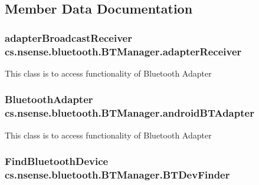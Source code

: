 \subsection{Member Data Documentation}
\hypertarget{classcs_1_1nsense_1_1bluetooth_1_1_b_t_manager_a58457a44485f8a07e52621a0e5c1c1c5}{
\subsubsection[{adapter\-Receiver}]{\setlength{\rightskip}{0pt plus 5cm}adapter\-Broadcast\-Receiver cs.\-nsense.\-bluetooth.\-B\-T\-Manager.\-adapter\-Receiver\hspace{0.3cm}{\ttfamily [private]}}}\label{classcs_1_1nsense_1_1bluetooth_1_1_b_t_manager_a58457a44485f8a07e52621a0e5c1c1c5}
This class is to access functionality of Bluetooth Adapter \hypertarget{classcs_1_1nsense_1_1bluetooth_1_1_b_t_manager_ae7d5108ed76162adaca84d5baad628a2}{
\subsubsection[{android\-B\-T\-Adapter}]{\setlength{\rightskip}{0pt plus 5cm}Bluetooth\-Adapter cs.\-nsense.\-bluetooth.\-B\-T\-Manager.\-android\-B\-T\-Adapter\hspace{0.3cm}{\ttfamily [private]}}}\label{classcs_1_1nsense_1_1bluetooth_1_1_b_t_manager_ae7d5108ed76162adaca84d5baad628a2}
This class is to access functionality of Bluetooth Adapter \hypertarget{classcs_1_1nsense_1_1bluetooth_1_1_b_t_manager_a35ae917d1d239f3c98291cc9859a3d31}{
\subsubsection[{B\-T\-Dev\-Finder}]{\setlength{\rightskip}{0pt plus 5cm}Find\-Bluetooth\-Device cs.\-nsense.\-bluetooth.\-B\-T\-Manager.\-B\-T\-Dev\-Finder\hspace{0.3cm}{\ttfamily [private]}}}\label{classcs_1_1nsense_1_1bluetooth_1_1_b_t_manager_a35ae917d1d239f3c98291cc9859a3d31}
